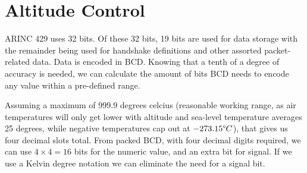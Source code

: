 \documentclass{article}
\begin{document}
\part{Altitude Control}

ARINC 429 uses 32 bits. Of these 32 bits, 19 bits are used for data storage with the remainder being used for handshake definitions and other assorted packet-related data. Data is encoded in BCD. Knowing that a tenth of a degree of accuracy is needed, we can calculate the amount of bits BCD needs to encode any value within a pre-defined range.

Assuming a maximum of $999.9$ degrees celcius (reasonable working range, as air temperatures will only get lower with altitude and sea-level temperature averages 25 degrees, while negative temperatures cap out at $\num{-273.15}\degree C$), that gives us four decimal slots total. From packed BCD, with four decimal digits required, we can use $4 \times 4 = 16$ bits for the numeric value, and an extra bit for signal. If we use a Kelvin degree notation we can eliminate the need for a signal bit.
\end{document}
